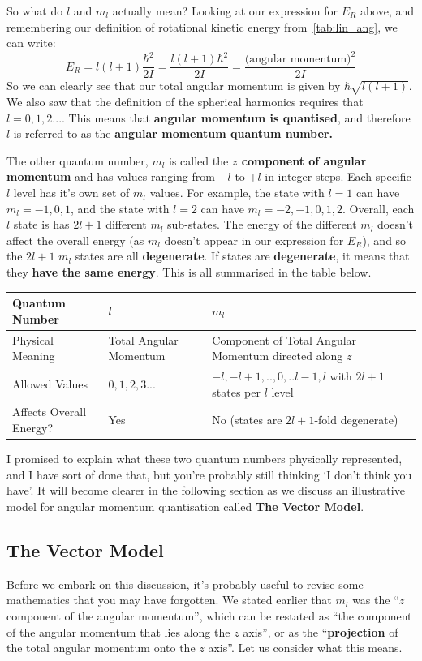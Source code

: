 \documentclass{memoir}[11pt,oneside,a4paper,openany]
\begin{document}
So what do $l$ and $m_l$ actually mean? Looking at our expression for $E_R$ above, and remembering our definition of rotational kinetic energy from~\autoref{tab:lin_ang}, we can write:
\begin{equation}
	E_R = l(l+1)\frac{\hbar^2}{2I} = \frac{l(l+1)\hbar^2}{2I} = \frac{\text{(angular momentum)}^2}{2I}
\end{equation}
So we can clearly see that our total angular momentum is given by $\hbar\sqrt{l(l+1)}$. We also saw that the definition of the spherical harmonics requires that $l=0,1,2...$. This means that \textbf{angular momentum is quantised}, and therefore $l$ is referred to as the \textbf{angular momentum quantum number.} 

The other quantum number, $m_l$ is called the \textbf{$z$ component of angular momentum} and has values ranging from $-l$ to $+l$ in integer steps. Each specific $l$ level has it's own set of $m_l$ values. For example, the state with $l=1$ can have $m_l = -1,0,1$, and the state with $l=2$ can have $m_l = -2,-1,0,1,2$. Overall, each $l$ state is has $2l+1$ different $m_l$ sub-states. The energy of the different $m_l$ doesn't affect the overall energy (as $m_l$ doesn't appear in our expression for $E_R$), and so the $2l+1$ $m_l$ states are all \textbf{degenerate}. If states are \textbf{degenerate}, it means that they \textbf{have the same energy}. This is all summarised in the table below.
\begin{table}[h]
\begin{tabular}{@{}lll@{}}
\toprule
Quantum Number & $l$ & $m_l$ \\ \midrule
Physical Meaning & Total Angular Momentum & Component of Total Angular Momentum directed along $z$  \\
Allowed Values & $0,1,2,3...$ &  $-l,-l+1,..,0,..l-1,l$ with $2l+1$ states per $l$ level  \\
Affects Overall Energy? & Yes & No (states are $2l+1$-fold degenerate) \\ \bottomrule
\end{tabular}
\end{table}

I promised to explain what these two quantum numbers physically represented, and I have sort of done that, but you're probably still thinking `I don't think you have'. It will become clearer in the following section as we discuss an illustrative model for angular momentum quantisation called \textbf{The Vector Model}.

\subsection{The Vector Model}
Before we embark on this discussion, it's probably useful to revise some mathematics that you may have forgotten. We stated earlier that $m_l$ was the ``$z$ component of the angular momentum'', which can be restated as ``the component of the angular momentum that lies along the $z$ axis'', or as the ``\textbf{projection} of the total angular momentum onto the $z$ axis''. Let us consider what this means.
\end{document}
